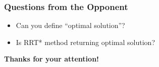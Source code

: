 \documentclass{beamer}
\begin{document}
\begin{frame}
	\frametitle{Questions from the Opponent}
	\begin{itemize}
		\item Can you define “optimal solution”?
		\item Is RRT* method returning optimal solution? 
	\end{itemize}	 
\end{frame}	

\begin{frame} 
	\vfill
    \centering
    \fontsize{24}{0}\selectfont
    \textbf{Thanks for your attention!}\\[1em] 
    \vfill
\end{frame}	




\end{document}
